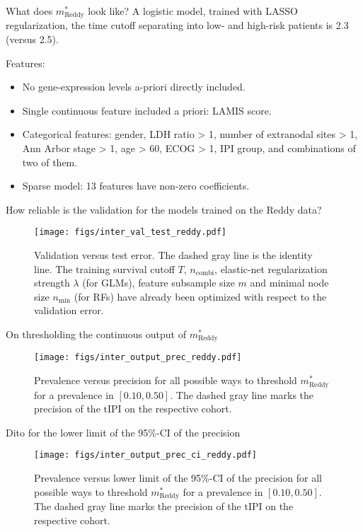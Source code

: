 \documentclass[10pt, aspectratio=169]{beamer}
\begin{document}
\begin{frame}{What does $m_\text{Reddy}^*$ look like?}
  A logistic model, trained with LASSO regularization, the time cutoff separating into low- and 
  high-risk patients is \num{2.3} (versus \num{2.5}).

  Features:
  \begin{itemize}
    \item No gene-expression levels a-priori directly included.
    \item Single continuous feature included a priori: LAMIS score.
    \item Categorical features: gender, LDH ratio > 1, number of extranodal sites > 1, Ann Arbor 
      stage > 1, age > 60, ECOG > 1, IPI group, and combinations of two of them.
    \item Sparse model: \num{13} features have non-zero coefficients.
  \end{itemize}
\end{frame}

\begin{frame}{How reliable is the validation for the models trained on the Reddy data?}
  \begin{figure}[ht]
    \centering
    \texttt{[image: figs/inter\_val\_test\_reddy.pdf]}
    \caption{Validation versus test error. The dashed gray line is the 
        identity line. The training survival cutoff $T$, 
        $n_\text{combi}$, elastic-net regularization strength $\lambda$ (for GLMs), 
        feature subsample size $m$ and minimal node size $n_\text{min}$ (for RFs) have already been 
        optimized with respect to the validation error.}
  \end{figure}
\end{frame}

\begin{frame}{On thresholding the continuous output of $m_\text{Reddy}^*$}
  \begin{figure}[ht]
    \centering
    \texttt{[image: figs/inter\_output\_prec\_reddy.pdf]}
    \caption{Prevalence versus precision for all possible ways to threshold $m^*_\text{Reddy}$ for 
      a prevalence in $[\num{0.10}, \num{0.50}]$.  The dashed gray line marks the precision of the 
      $\text{tIPI}$ on the respective cohort.}
  \end{figure}
\end{frame}

\begin{frame}{Dito for the lower limit of the 95\%-CI of the precision}
  \begin{figure}[ht]
    \centering
    \texttt{[image: figs/inter\_output\_prec\_ci\_reddy.pdf]}
    \caption{Prevalence versus lower limit of the \num{95}\%-CI of the precision for all possible 
      ways to threshold $m^*_\text{Reddy}$ for a prevalence in $[\num{0.10}, \num{0.50}]$. The 
      dashed gray line marks the precision of the $\text{tIPI}$ on the respective cohort.}
  \end{figure}
\end{frame}
\end{document}
